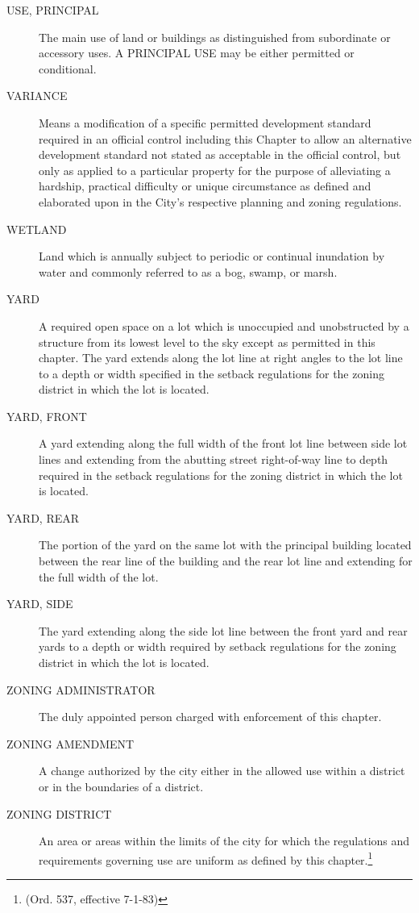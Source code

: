 \begin{description}
    \item[USE, PRINCIPAL] The main use of land or buildings as distinguished from subordinate or accessory uses.  A PRINCIPAL USE may be either permitted or conditional.
    \item[VARIANCE] Means a modification of a specific permitted development standard required in an official control including this Chapter to allow an alternative development standard not stated as acceptable in the official control, but only as applied to a particular property for the purpose of alleviating a hardship, practical difficulty or unique circumstance as defined and elaborated upon in the City's respective planning and zoning regulations.
    \item[WETLAND] Land which is annually subject to periodic or continual inundation by water and commonly referred to as a bog, swamp, or marsh.
    \item[YARD] A required open space on a lot which is unoccupied and unobstructed by a structure from its lowest level to the sky except as permitted in this chapter. The yard extends along the lot line at right angles to the lot line to a depth or width specified in the setback regulations for the zoning district in which the lot is located.
    \item[YARD, FRONT] A yard extending along the full width of the front lot line between side lot lines and extending from the abutting street right-of-way line to depth required in the setback regulations for the zoning district in which the lot is located.
    \item[YARD, REAR] The portion of the yard on the same lot with the principal building located between the rear line of the building and the rear lot line and extending for the full width of the lot.
    \item[YARD, SIDE] The yard extending along the side lot line between the front yard and rear yards to a depth or width required by setback regulations for the zoning district in which the lot is located.
    \item[ZONING ADMINISTRATOR] The duly appointed person charged with enforcement of this chapter.
    \item[ZONING AMENDMENT] A change authorized by the city either in the allowed use within a district or in the boundaries of a district.
    \item[ZONING DISTRICT] An area or areas within the limits of the city for which the regulations and requirements governing use are uniform as defined by this chapter.\footnote{(Ord. 537, effective 7-1-83)}
\end{description}

